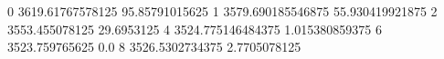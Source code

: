 0 3619.61767578125 95.85791015625
1 3579.690185546875 55.930419921875
2 3553.455078125 29.6953125
4 3524.775146484375 1.015380859375
6 3523.759765625 0.0
8 3526.5302734375 2.7705078125
